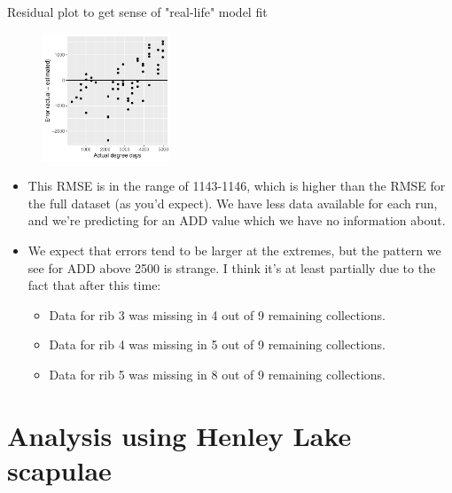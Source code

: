 \documentclass{beamer}
\begin{document}
\begin{frame}{Residual plot to get sense of "real-life" model fit}

  \begin{center}
  \begin{figure}
    \includegraphics[width=1.5in]{w_ribs/leave_out_one_rib_and_one_day_residuals}
  \end{figure}
  \end{center}  

  \vspace{0.1in}

  {\scriptsize
 
    \begin{itemize}
    \item This RMSE is in the range of 1143-1146, which is higher than
      the RMSE for the full dataset (as you'd expect).  We have less
      data available for each run, and we're predicting for an ADD
      value which we have no information about.
    \item We expect that errors tend to be larger at the extremes, but
      the pattern we see for ADD above 2500 is strange.  I think it's
      at least partially due to the fact that after this time:
      \begin{itemize}
      \item {\scriptsize Data for rib 3 was missing in 4 out of 9 remaining collections.}
      \item {\scriptsize Data for rib 4 was missing in 5 out of 9 remaining collections.}
      \item {\scriptsize Data for rib 5 was missing in 8 out of 9 remaining collections.}
      \end{itemize}
    \end{itemize}
  }

\end{frame}




\section[Scapulae]{Analysis using Henley Lake scapulae}
\end{document}
